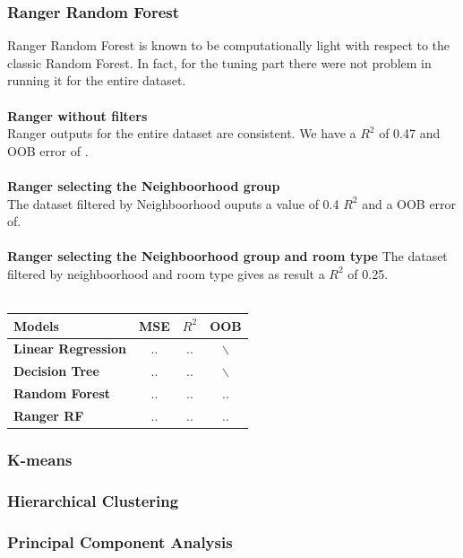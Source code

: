 \documentclass{FR16}
\begin{document}
\subsubsection{Ranger Random Forest}
Ranger Random Forest is known to be computationally light with respect to the classic Random Forest. In fact, for the tuning part there were not problem in running it for the entire dataset. 
\\\\ \textbf{Ranger without filters}\\
Ranger outputs for the entire dataset are consistent. We have a $R^2$ of 0.47 and OOB error of .
\\\\
\textbf{Ranger selecting the Neighboorhood group}\\
The dataset filtered by Neighboorhood ouputs a value of 0.4 $R^2$ and a OOB error of.
\\\\ 
\textbf{Ranger selecting the Neighboorhood group and room type}
The dataset filtered by neighboorhood and room type gives as result a $R^2$ of 0.25.
\\\\
\begin{center}
\begin{tabular}{l c c c }
\arrayrulecolor{Azzurro}
\hline
{\bfseries Models
} & MSE & $R^2$ & OOB \\
\hline
{\bfseries Linear Regression} & .. & .. & $\backslash$ \\
{\bfseries Decision Tree} & .. & .. & $\backslash$ \\
{\bfseries Random Forest} & .. & .. & .. \\
{\bfseries Ranger RF} & .. & .. & .. \\
\hline
\end{tabular}
\end{center}
\subsubsection{K-means}


\subsubsection{Hierarchical Clustering}

\subsubsection{Principal Component Analysis}
\end{document}

